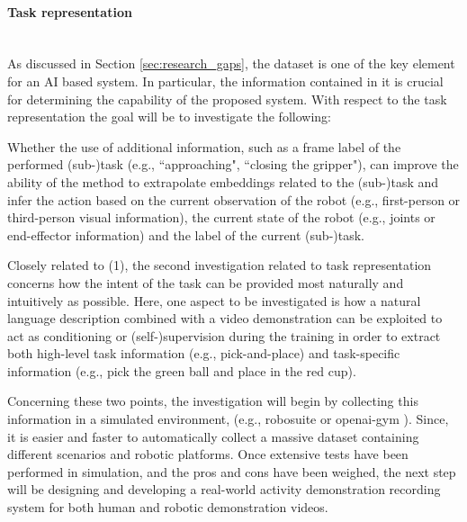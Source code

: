 \paragraph{Task representation} \mbox{} \\
As discussed in Section \ref{sec:research_gaps}, the dataset is one of the key element for an AI based system. In particular, the information contained in it is crucial for determining the capability of the proposed system. With respect to the task representation the goal will be to investigate the following:
    \begin{enumerate*}[label=\textbf{(\arabic*)}]
    \item Whether the use of additional information, such as a frame label of the performed (sub-)task (e.g., ``approaching", ``closing the gripper"), can improve the ability of the method to extrapolate embeddings related to the (sub-)task and infer the action based on the current observation of the robot (e.g., first-person or third-person visual information), the current state of the robot (e.g., joints or end-effector information) and the label of the current (sub-)task. 
    \item Closely related to (1), the second investigation related to task representation concerns how the intent of the task can be provided most naturally and intuitively as possible. Here, one aspect to be investigated is how a natural language description combined with a video demonstration can be exploited to act as conditioning or (self-)supervision during the training in order to extract both high-level task information (e.g., pick-and-place) and task-specific information (e.g., pick the green ball and place in the red cup).
    \end{enumerate*} Concerning these two points, the investigation will begin by collecting this information in a simulated environment, (e.g., robosuite \cite{zhu2020robosuite} or openai-gym \cite{brockman2016openai}). Since, it is easier and faster to automatically collect a massive dataset containing different scenarios and robotic platforms. Once extensive tests have been performed in simulation, and the pros and cons have been weighed, the next step will be designing and developing a real-world activity demonstration recording system for both human and robotic demonstration videos.  
